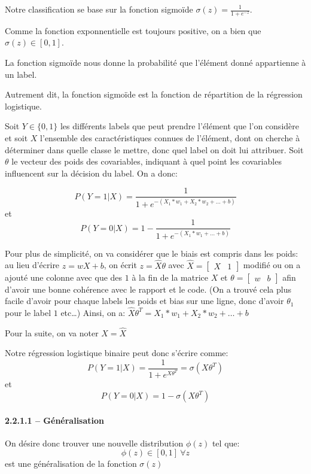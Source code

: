 \documentclass[
]{article}
\begin{document}
Notre classification se base sur la fonction sigmoïde
\(\sigma(z) = \frac{1}{1 + e^{-z}}\).

Comme la fonction exponnentielle est toujours positive, on a bien que
\(\sigma(z) \in [0, 1]\).

La fonction sigmoïde nous donne la probabilité que l'élément donné
appartienne à un label.

Autrement dit, la fonction sigmoïde est la fonction de répartition de la
régression logistique.

Soit \(Y \in \{0, 1\}\) les différents labels que peut prendre l'élément
que l'on considère et soit \(X\) l'ensemble des caractéristiques connues
de l'élément, dont on cherche à déterminer dans quelle classe le mettre,
donc quel label on doit lui attribuer. Soit \(\theta\) le vecteur des
poids des covariables, indiquant à quel point les covariables
influencent sur la décision du label. On a donc:

\[P(Y = 1 | X) = \frac{1}{1 + e^{-(X_1 * w_1 + X_2*w_2 + \dots + b)}}\]
et \[P(Y = 0 | X) = 1 - \frac{1}{1 + e^{-(X_1 * w_1 + \dots + b)}}\]

Pour plus de simplicité, on va considérer que le biais est compris dans
les poids: au lieu d'écrire \(z = wX + b\), on écrit
\(z = \hat{X}\theta\) avec
\(\hat{X} = \begin{bmatrix} X & 1 \end{bmatrix}\) modifié ou on a ajouté
une colonne avec que des \(1\) à la fin de la matrice \(X\) et
\(\theta = \begin{bmatrix} w & b \end{bmatrix}\) afin d'avoir une bonne
cohérence avec le rapport et le code. (On a trouvé cela plus facile
d'avoir pour chaque labels les poids et bias sur une ligne, donc d'avoir
\(\theta_1\) pour le label \(1\) etc\ldots) Ainsi, on a:
\(\hat{X} \theta^T = X_1 * w_1 + X_2 * w_2 + \dots + b\)

Pour la suite, on va noter \(X = \hat{X}\)

Notre régression logistique binaire peut donc s'écrire comme:
\[P(Y = 1 | X) = \frac{1}{1 + e^{X \theta^T}} = \sigma(X \theta^T)\] et
\[P(Y = 0 | X) = 1 - \sigma(X \theta^T)\]

\paragraph{2.2.1.1 -- Généralisation}\label{guxe9nuxe9ralisation}

On désire donc trouver une nouvelle distribution \(\phi(z)\) tel que:
\[\phi(z) \in [0, 1]\ \forall z\] est une généralisation de la fonction
\(\sigma(z)\)
\end{document}
